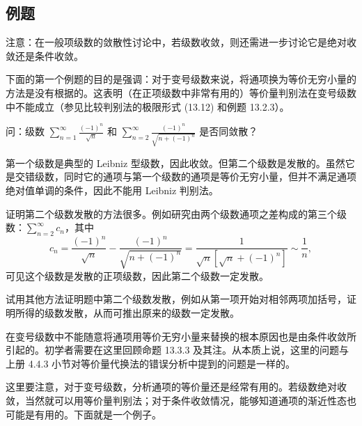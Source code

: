 \subsection{例题}

注意：在一般项级数的敛散性讨论中，若级数收敛，则还需进一步讨论它是绝对收敛还是条件收敛。

下面的第一个例题的目的是强调：对于变号级数来说，将通项换为等价无穷小量的方法是没有根据的。这表明（在正项级数中非常有用的）等价量判别法在变号级数中不能成立（参见比较判别法的极限形式 (13.12) 和例题 13.2.3）。

\begin{xexample}[13.3.1]
问：级数 $\sum_{n=1}^{\infty}\frac{(-1)^n}{\sqrt n}$ 和 $\sum_{n=2}^{\infty}\frac{(-1)^n}{\sqrt{n+(-1)^n}}$ 是否同敛散？
\end{xexample}
\begin{xsolution}
第一个级数是典型的 Leibniz 型级数，因此收敛。但第二个级数是发散的。虽然它是交错级数，同时它的通项与第一个级数的通项是等价无穷小量，但并不满足通项绝对值单调的条件，因此不能用 Leibniz 判别法。

证明第二个级数发散的方法很多。例如研究由两个级数通项之差构成的第三个级数：$\sum_{n=2}^{\infty}c_n$，其中
\[
c_n=\frac{(-1)^n}{\sqrt n}-\frac{(-1)^n}{\sqrt{n+(-1)^n}}
=\frac1{\sqrt n[\sqrt n+(-1)^n]}\sim\frac1n,
\]
可见这个级数是发散的正项级数，因此第二个级数一定发散。
\end{xsolution}

\begin{xremark}
试用其他方法证明题中第二个级数发散，例如从第一项开始对相邻两项加括号，证明所得的级数发散，从而可推出原来的级数一定发散。
\end{xremark}

\begin{xremark}
在变号级数中不能随意将通项用等价无穷小量来替换的根本原因也是由条件收敛所引起的。初学者需要在这里回顾命题 13.3.3 及其注。从本质上说，这里的问题与上册 4.4.3 小节对等价量代换法的错误分析中提到的问题是一样的。
\end{xremark}

\begin{xremark}
这里要注意，对于变号级数，分析通项的等价量还是经常有用的。若级数绝对收敛，当然就可以用等价量判别法；对于条件收敛情况，能够知道通项的渐近性态也可能是有用的。下面就是一个例子。
\end{xremark}

